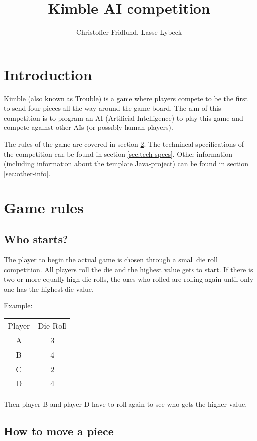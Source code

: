 \documentclass[10pt,a4paper]{article}
\author{Christoffer Fridlund, Lasse Lybeck}
\title{Kimble AI competition}
\begin{document}
\maketitle


\section{Introduction}

Kimble (also known as Trouble) is a game where players compete to be the first to send four pieces all the way around the game board. The aim of this competition is to program an AI (Artificial Intelligence) to play this game and compete against other AIs (or possibly human players).

The rules of the game are covered in section \ref{sec:rules}. The technincal specifications of the competition can be found in section \ref{sec:tech-specs}. Other information (including information about the template Java-project) can be found in section \ref{sec:other-info}.


\section{Game rules}
\label{sec:rules}


\subsection{Who starts?}
The player to begin the actual game is chosen through a small die roll competition. All players roll the die and the highest value gets to start. If there is two or more equally high die rolls, the ones who rolled are rolling again until only one has the highest die value.

Example:
\begin{center}
\begin{tabular}{c c}
	Player & Die Roll \\
	A & 3 \\
	B & 4 \\
	C & 2 \\
	D & 4
\end{tabular} 
\end{center}

Then player B and player D have to roll again to see who gets the higher value.

\subsection{How to move a piece}
\end{document}
